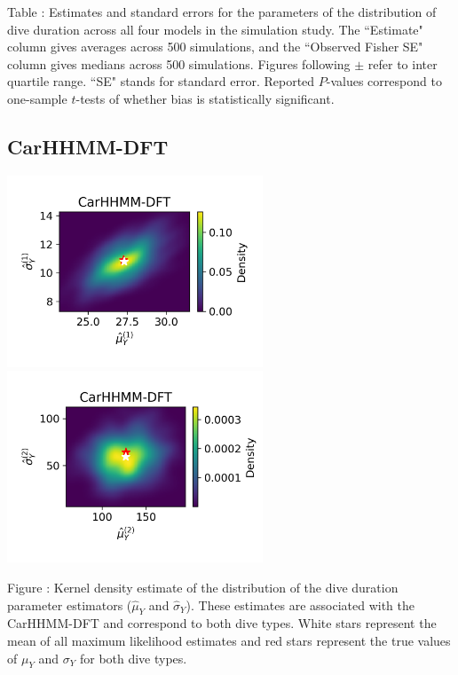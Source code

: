 \documentclass{article}
\begin{document}
        \noindent Table : Estimates and standard errors for the parameters of the distribution of dive duration across all four models in the simulation study. The ``Estimate" column gives averages across 500 simulations, and the ``Observed Fisher SE" column gives medians across 500 simulations. Figures following $\pm$ refer to inter quartile range. ``SE" stands for standard error. Reported $P$-values correspond to one-sample $t$-tests of whether bias is statistically significant.
        \addtocounter{tablenum}{1}
        
        \newpage
        
        \subsection{CarHHMM-DFT}
        \begin{center}
        \includegraphics[width=3in]{../Plots/hhmm_FV_MLE_density_dive_duration_-1_0.png}
        \includegraphics[width=3in]{../Plots/hhmm_FV_MLE_density_dive_duration_-1_1.png}
        \end{center}
        
        \noindent Figure : Kernel density estimate of the distribution of the dive duration parameter estimators ($\hat \mu_Y$ and $\hat \sigma_Y$). These estimates are associated with the CarHHMM-DFT and correspond to both dive types. White stars represent the mean of all maximum likelihood estimates and red stars represent the true values of $\mu_Y$ and $\sigma_Y$ for both dive types.
        \addtocounter{fignum}{1}
        
\end{document}
